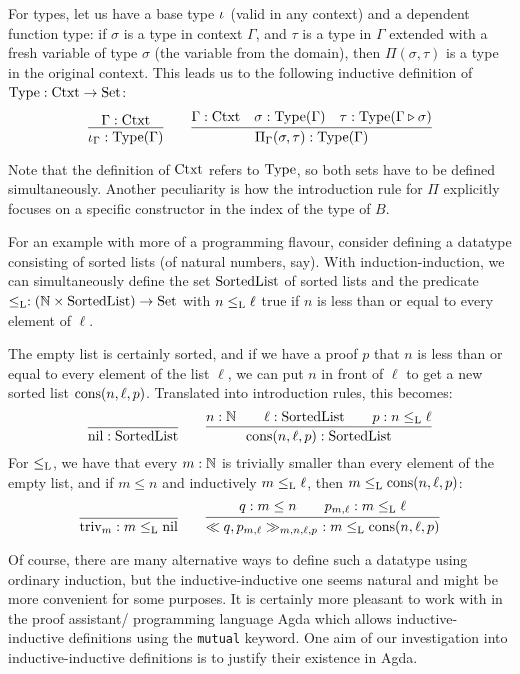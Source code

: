 \documentclass[orivec,envcountsame, ,envcountsect]{llncs}
\begin{document}
For types, let us have a base type $\iota_{}$ (valid in any context)
and a dependent function type: if $\sigma$ is a type in context $\Gamma$,
and $\tau$ is a type in $\Gamma$ extended with a fresh variable of type
$\sigma$ (the variable from the domain), then $\Pi(\sigma, \tau)$ is a
type in the original context. This leads us to the following inductive
definition of $\text{Type} : \text{Ctxt} \to \text{Set}$:
\[
\infer{\baseTy{\Gamma} : \Type(\Gamma)}{\Gamma : \Ctxt} \qquad
\infer{\piTy{\Gamma}{\sigma}{\tau} : \Type(\Gamma)}{\Gamma : \Ctxt
                    & \sigma : \Type(\Gamma)
                    & \tau : \Type(\consCtxt{\Gamma}{\sigma})}
\]

Note that the definition of $\text{Ctxt}$ refers to $\text{Type}$, so both sets
have to be defined simultaneously. Another peculiarity is how the
introduction rule for $\Pi$ explicitly focuses on a specific
constructor in the index of the type of $B$.

For an example with more of a programming flavour, consider defining a
datatype consisting of sorted lists (of natural numbers, say). With
induction-induction, we can simultaneously define the set
$\text{SortedList}$ of sorted lists and the predicate $\leq_{\text{L}} : (\mathbb{N}
\times \text{SortedList}) \to \text{Set}$ with $n \leq_{\text{L}} \ell$ true if $n$ is
less than or equal to every element of $\ell$.

The empty list is certainly sorted, and if we have a proof $p$ that
$n$ is less than or equal to every element of the list $\ell$, we can
put $n$ in front of $\ell$ to get a new sorted list
$\text{cons}(n, \ell, p)$. Translated into introduction rules, this becomes:
\[
\infer{\nilList : \SortedList}{} \qquad
\infer{\consList{n}{\ell}{p} : \SortedList}{n : \Nat \quad & \ell : \SortedList \quad & p : n \lessList \ell}
\]
For $\leq_{\text{L}}$, we have that every $m : \mathbb{N}$ is trivially smaller
than every element of the empty list, and if $m \leq n$ and
inductively $m \leq_{\text{L}} \ell$, then $m \leq_{\text{L}} \text{cons}(n, \ell, p)$:
\[
\infer{\nilLess{m} : m \lessList \nilList}
{} \qquad
\infer{\consLess{n}{\ell}{p}{m}{q}{p_{m, \ell}}\ : m \lessList \consList{n}{\ell}{p}}
       {q : m \leq n \quad & p_{m, \ell} : m \lessList \ell}
\]

Of course, there are many alternative ways to define such a datatype
using ordinary induction, but the inductive-inductive one seems
natural and might be more convenient for some purposes. It is
certainly more pleasant to work with in the proof assistant/
programming language Agda \cite{norell2007thesis} which allows
inductive-inductive definitions using the \texttt{mutual} keyword. One
aim of our investigation into inductive-inductive definitions is to
justify their existence in Agda.
\end{document}
